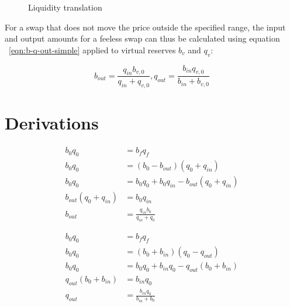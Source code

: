 \documentclass[table, twocolumn]{article}
\begin{document}
\begin{figure}[ht]
  \centering
  
  \caption{Liquidity translation}
  \label{fig:liquidity-translation}
\end{figure}

For a swap that does not move the price outside the specified range, the input and output amounts
for a feeless swap can thus be calculated using equation ~\ref{eqn:b-q-out-simple} applied to
virtual reserves $b_v$ and $q_v$:

\begin{equation}
  b_{out} = \frac{q_{in} b_{v, 0}}{q_{in} + q_{v, 0}},
  q_{out} = \frac{b_{in} q_{v, 0}}{b_{in} + b_{v, 0}}
\end{equation}

\appendix

\section{Derivations}

\begin{align} \label{eqn:b-out-simple-derivation}
  b_0 q_0               & = b_f q_f         \nonumber                              \\
  b_0 q_0               & = (b_0 - b_{out})(q_0 + q_{in}) \nonumber                \\
  b_0 q_0               & = b_0 q_0 + b_0 q_{in} - b_{out}(q_0 + q_{in}) \nonumber \\
  b_{out}(q_0 + q_{in}) & = b_{0} q_{in} \nonumber                                 \\
  b_{out}               & = \frac{q_{in} b_0}{q_{in} + q_0}
\end{align}

\begin{align} \label{eqn:q-out-simple-derivation}
  b_0 q_0               & = b_f q_f         \nonumber                              \\
  b_0 q_0               & = (b_0 + b_{in})(q_0 - q_{out}) \nonumber                \\
  b_0 q_0               & = b_0 q_0 + b_{in} q_0 - q_{out}(b_0 + b_{in}) \nonumber \\
  q_{out}(b_0 + b_{in}) & = b_{in} q_0 \nonumber                                   \\
  q_{out}               & = \frac{b_{in} q_0}{b_{in} + b_0}
\end{align}
\end{document}
